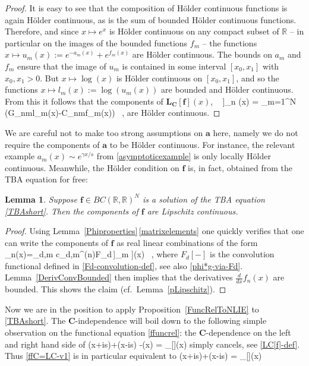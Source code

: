 \documentclass[12pt]{article}
\theoremstyle{plain}
\newtheorem{lemma}[theorem]{Lemma}
\theoremstyle{definition}
\numberwithin{equation}{section}
\numberwithin{theorem}{section}
\def\be#1\ee{\begin{equation}#1\end{equation}}
\renewcommand{\vec}[1]{\mathbf{#1}}
\begin{document}
\begin{proof}
It is easy to see that the composition of H\"older continuous functions is again H\"older continuous, as is the sum of bounded H\"older continuous functions.
Therefore, and since $x\mapsto e^x$ is H\"older continuous on any compact subset of $\mathbb{R}$ -- in particular on the images of the bounded functions $f_m$ -- the functions $x\mapsto u_m(x):=e^{-a_m(x)}+e^{f_m(x)}$ are H\"older continuous. The bounds on $a_m$ and $f_m$ ensure that the image of $u_m$ is contained in some interval $[x_0,x_1]$ with $x_0,x_1>0$.
But $x\mapsto \log(x)$ is H\"older continuous on $[x_0,x_1]$, and so the functions $x\mapsto l_m(x):=\log(u_m(x))$ are 
	bounded and
H\"older continuous. From this it follows that the components of $\vec{L}_{\vec{C}}[\vec{f}](x)$,
\be
x \,\longmapsto\, \left[\,\vec{L}_{\vec{C}}[\vec{f}]\,\right]_n (x)
= \sum_{m=1}^N \left(G_{nm}l_m(x)-C_{nm}f_m(x)\right) \ ,
\ee
are H\"older continuous.
\end{proof}

We are careful not to make too strong assumptions on $\vec{a}$ here, namely we do not require the components of $\vec{a}$ to be H\"older continuous. For instance, the relevant example $a_m(x) \sim e^{\gamma x/s}$ from \eqref{asymptoticexample} is only locally H\"older continuous.
Meanwhile, the H\"older condition on $\vec{f}$ is, in fact, obtained from the TBA equation for free:

\begin{lemma} \label{alwayshoelder} Suppose $\vec{f}\in BC(\mathbb{R},\mathbb{R})^N$ is a solution of the TBA equation \eqref{TBAshort}. Then the components of $\vec{f}$ are 
Lipschitz continuous.
\end{lemma}

\begin{proof}
Using Lemma~\ref{Phiproperties}\,\ref{matrixelements} one quickly verifies that one can 
write the components of $\vec{f}$ as real linear combinations
of the form
\be
f_n(x)=\sum_{d,m} c_{d,m}^{(n)}F_d\big[\left[\,\vec{L}_{\vec{C}}[\vec{f}]\,\right]_m \big](x) \ ,
\ee 
where $F_d[-]$ is the convolution functional defined in \eqref{Fd-convolution-def}, see also \eqref{phi*g-via-Fd}.
Lemma~\ref{DerivConvBounded} then implies that the derivatives $\frac{d}{dx}f_n(x)$ are bounded. 
	This shows the claim (cf.\ Lemma~\ref{pLipschitz}).
\end{proof}


Now we are in the position to apply Proposition~\ref{FuncRelToNLIE} to \eqref{TBAshort}.
	The $\vec{C}$-independence will boil down to the following simple observation on the functional equation \eqref{ffuncrel}: the $\vec{C}$-dependence on the left and right hand side of
\be\label{ffC=LC-v1}
\vec{f}(x+is)+\vec{f}(x-is) -\vec{C}\cdot\vec{f}(x) = \vec{L}_{\vec{C}}[\vec{f}](x) 
\ee
simply cancels, see \eqref{LC[f]-def}. Thus \eqref{ffC=LC-v1} is in particular equivalent to
\be\label{ffC=LC-v2}
\vec{f}(x+is)+\vec{f}(x-is) = \vec{L}_{\vec{0}}[\vec{f}](x) 
\ee
\end{document}
